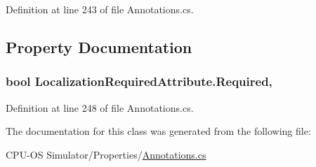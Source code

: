 Definition at line 243 of file Annotations.\+cs.



\subsection{Property Documentation}
\hypertarget{class_localization_required_attribute_af8b46c34356964b9b15c22c7e5113d23}{}
\subsubsection[{Required}]{\setlength{\rightskip}{0pt plus 5cm}bool Localization\+Required\+Attribute.\+Required\hspace{0.3cm}{\ttfamily [get]}, {}}\label{class_localization_required_attribute_af8b46c34356964b9b15c22c7e5113d23}


Definition at line 248 of file Annotations.\+cs.



The documentation for this class was generated from the following file\+:\begin{DoxyCompactItemize}
\item 
C\+P\+U-\/\+O\+S Simulator/\+Properties/\hyperlink{_annotations_8cs}{Annotations.\+cs}\end{DoxyCompactItemize}
